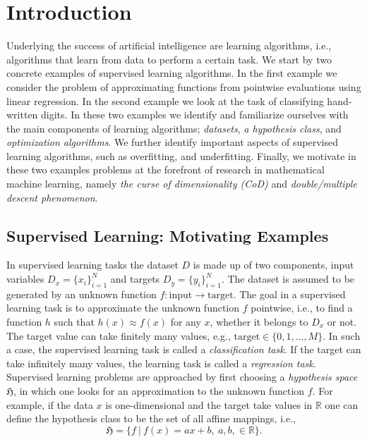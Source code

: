 \chapter{Introduction} %

\label{Chapter1} %
\setcounter{chapter}{1}

\newcommand{\keyword}[1]{\textbf{#1}}
\newcommand{\tabhead}[1]{\textbf{#1}}
\newcommand{\code}[1]{\texttt{#1}}
\newcommand{\file}[1]{\texttt{\bfseries#1}}
\newcommand{\option}[1]{\texttt{\itshape#1}}
Underlying the success of artificial intelligence are learning algorithms, i.e.,
algorithms that learn from data to perform a certain task. We start by
two concrete examples of supervised learning algorithms. In the first example we
consider the problem of approximating functions from pointwise evaluations using linear regression. In the second example we look at the task of
classifying hand-written digits. In these two examples we identify and
familiarize ourselves with the main components of learning algorithms;
\emph{datasets}, \emph{a hypothesis class}, and \emph{optimization algorithms}.
We further identify important aspects of supervised learning algorithms, such as
overfitting, and underfitting. Finally, we motivate in these two examples
problems at the forefront of research in mathematical machine learning, namely
\emph{the curse of dimensionality (CoD)} and \emph{double/multiple descent phenomenon}. 
 
\section{Supervised Learning: Motivating Examples}
In supervised learning tasks the dataset $D$ is made up of
two components, input variables $D_x = \{x_i\}_{i = 1}^N$ and targets $D_y = \{y_i\}_{i=1}^N$. The dataset is assumed to be
generated by an unknown function $f: \text{input} \to \text{target}$. The goal in
a supervised learning task is to approximate the unknown function $f$ pointwise,
i.e., to find a function $h$ such that $h(x) \approx f(x)$ for any $x$, whether
it belongs to $D_x$ or not. The target value can take finitely many values,
e.g., $\text{target} \in \{0,1, \dots, M\}$. In such a case, the supervised
learning task is called a \emph{classification task}. If the target can take
infinitely many values, the learning task is called a \emph{regression task}.  
Supervised learning problems are approached by first choosing a \emph{hypothesis
space} $\mathfrak{H}$, in which one looks for an approximation to the unknown function $f$. For example, if the data $x$ is one-dimensional and the target
take values in $\mathbb{R}$ one can define the hypothesis class to be the set of
all affine mappings, i.e., 
\begin{equation}
    \label{eq:affine_mappings}
\mathfrak{H} = \bigl\{f \ | \ f(x) = ax + b, \ a, b, \in \mathbb{R}    
\bigr\}.
\end{equation}

